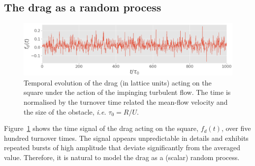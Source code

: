 \documentclass{jfm}
\begin{document}
\subsection{The drag as a random process
}
\label{sec:pdfs}

\begin{figure}
  \centering
  \includegraphics[width=0.7\linewidth]{typical_drag_signal/typical_drag_signal.png}
  \caption{Temporal evolution of the drag (in lattice units) acting on the square under the action of the impinging turbulent flow. The time is normalised by the turnover time related the mean-flow velocity and the size of the obstacle, \emph{i.e.} $\tau_0=R/U$.}
  \label{fig:typical_drag_signal}
\end{figure}



%
Figure~\ref{fig:typical_drag_signal} shows the time signal of the drag acting on the square, $f_d(t)$, over five hundred turnover times.
The signal appears unpredictable in details and exhibits repeated bursts of high amplitude that deviate significantly from the averaged value.
Therefore, it is natural to model the drag as a (scalar) random process.
\end{document}
